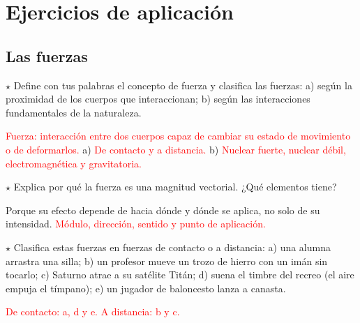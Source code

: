 \section{Ejercicios de aplicación}\label{sec:ud10-aplicacion}

\subsection{Las fuerzas}

\begin{exercise}
    \(\star\) Define con tus palabras el concepto de fuerza y clasifica las fuerzas: a) según la proximidad de los cuerpos que
    interaccionan; b) según las interacciones fundamentales de la naturaleza.
    \begin{solu}
        \textcolor{red}{Fuerza: interacción entre dos cuerpos capaz de cambiar su estado de movimiento o de deformarlos.}
        a) \textcolor{red}{De contacto y a distancia.} b) \textcolor{red}{Nuclear fuerte, nuclear débil, electromagnética y
        gravitatoria.}
    \end{solu}
\end{exercise}

\begin{exercise}
    \(\star\) Explica por qué la fuerza es una magnitud vectorial. ¿Qué elementos tiene?
    \begin{solu}
        Porque su efecto depende de hacia dónde y dónde se aplica, no solo de su intensidad. \textcolor{red}{Módulo, dirección,
        sentido y punto de aplicación.}
    \end{solu}
\end{exercise}

\begin{exercise}
    \(\star\) Clasifica estas fuerzas en fuerzas de contacto o a distancia: a) una alumna arrastra una silla; b) un profesor mueve
    un trozo de hierro con un imán sin tocarlo; c) Saturno atrae a su satélite Titán; d) suena el timbre del recreo (el aire empuja
    el tímpano); e) un jugador de baloncesto lanza a canasta.
    \begin{solu}
        \textcolor{red}{De contacto: a, d y e. A distancia: b y c.}
    \end{solu}
\end{exercise}

